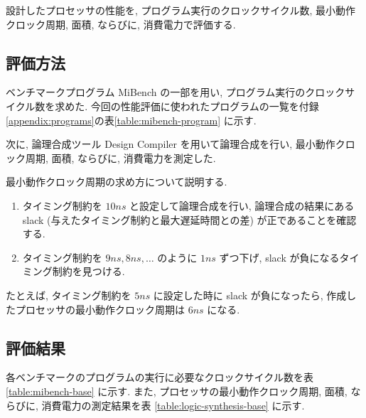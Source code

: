 \documentclass[../main.tex]{subfiles}
\begin{document}
  設計したプロセッサの性能を, プログラム実行のクロックサイクル数, 
  最小動作クロック周期, 面積, ならびに, 消費電力で評価する.

  \subsection{評価方法}
  ベンチマークプログラム MiBench \cite{mibench} の一部を用い, プログラム実行のクロックサイクル数を求めた.
  今回の性能評価に使われたプログラムの一覧を付録\ref{appendix:programs}の表\ref{table:mibench-program} に示す.

  次に, 論理合成ツール Design Compiler を用いて論理合成を行い, 
  最小動作クロック周期, 面積, ならびに, 消費電力を測定した.

  最小動作クロック周期の求め方について説明する.
  \begin{enumerate}
    \item タイミング制約を $10ns$ と設定して論理合成を行い, 
    論理合成の結果にある slack (与えたタイミング制約と最大遅延時間との差) が正であることを確認する.
    \item タイミング制約を $9ns, 8ns, \ldots$ のように $1ns$ ずつ下げ, 
    slack が負になるタイミング制約を見つける.
  \end{enumerate}

  たとえば, タイミング制約を $5ns$ に設定した時に slack が負になったら, 
  作成したプロセッサの最小動作クロック周期は $6ns$ になる.

  \subsection{評価結果}
  各ベンチマークのプログラムの実行に必要なクロックサイクル数を表 \ref{table:mibench-base} に示す.
  また, プロセッサの最小動作クロック周期, 面積, ならびに, 消費電力の測定結果を表 \ref{table:logic-synthesis-base} に示す.

  \begin{table}[tbh]
    \centering
    \caption{ベンチマークプログラムの実行クロックサイクル数(改善前)}
    \label{table:mibench-base}
  \end{table}

  \begin{table}[tbh]
    \centering
    \caption{論理合成の結果(改善前)}
    \label{table:logic-synthesis-base}
  \end{table}
\end{document}
